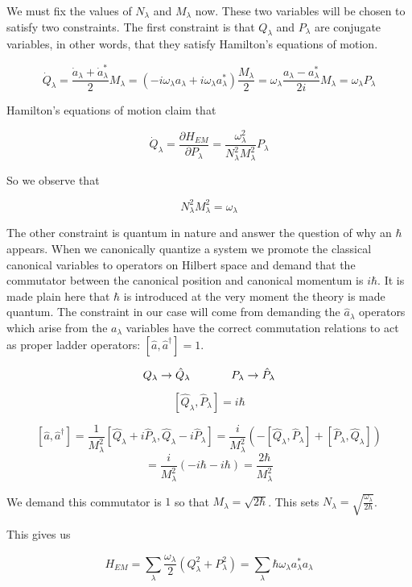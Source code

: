 \documentclass[12pt]{article}
\newcommand{\pardiv}[2][]{\frac{\partial #1}{\partial #2}}
\begin{document}
We must fix the values of $N_{\lambda}$ and $M_{\lambda}$ now. These two variables will be chosen to satisfy two constraints. The first constraint is that $Q_{\lambda}$ and $P_{\lambda}$ are conjugate variables, in other words, that they satisfy Hamilton's equations of motion.

\[\dot{Q}_{\lambda} = \frac{\dot{a}_{\lambda}+\dot{a}_{\lambda}^*}{2} M_{\lambda} = (-i\omega_{\lambda} a_{\lambda} + i\omega_{\lambda}a_{\lambda}^*) \frac{M_{\lambda}}{2} = \omega_{\lambda}\frac{a_{\lambda}-a_{\lambda}^*}{2i}M_{\lambda} = \omega_{\lambda}P_{\lambda}  \] 

Hamilton's equations of motion claim that

\[ \dot{Q}_{\lambda} = \pardiv[H_{EM}]{P_{\lambda}} = \frac{\omega_{\lambda}^2}{N_{\lambda}^2 M_{\lambda}^2} P_{\lambda} \]

So we observe that

\[N_{\lambda}^2 M_{\lambda}^2 = \omega_{\lambda} \]

The other constraint is quantum in nature and answer the question of why an $\hbar$ appears. When we canonically quantize a system we promote the classical canonical variables to operators on Hilbert space and demand that the commutator between the canonical position and canonical momentum is $i \hbar$. It is made plain here that $\hbar$ is introduced at the very moment the theory is made quantum. The constraint in our case will come from demanding the $\hat{a}_{\lambda}$ operators which arise from the $a_{\lambda}$ variables have the correct commutation relations to act as proper ladder operators: $[\hat{a},\hat{a}^{\dag}] = 1$.

\[ Q_{\lambda} \rightarrow \hat{Q}_{\lambda} \hspace{.5 in} P_{\lambda} \rightarrow \hat{P}_{\lambda} \]

\[ [\hat{Q}_{\lambda},\hat{P}_{\lambda}] = i\hbar \] 

\[ [\hat{a},\hat{a}^{\dag}] = \frac{1}{M_{\lambda}^2}[\hat{Q}_{\lambda} + i \hat{P}_{\lambda},\hat{Q}_{\lambda} - i \hat{P}_{\lambda} ] = \frac{i}{M_{\lambda}^2} (-[\hat{Q}_{\lambda},\hat{P}_{\lambda}] + [\hat{P}_{\lambda},\hat{Q}_{\lambda}])  \]
\[ = \frac{i}{M_{\lambda}^2}(-i\hbar - i\hbar) = \frac{2 \hbar}{M_{\lambda}^2} \]

We demand this commutator is $1$ so that $M_{\lambda} = \sqrt{2\hbar}$. This sets $N_{\lambda} = \sqrt{\frac{\omega_{\lambda}}{2 \hbar}}$.

This gives us

\[H_{EM} = \sum_{\lambda} \frac{\omega_{\lambda}}{2} (Q_{\lambda}^2 + P_{\lambda}^2 ) = \sum_{\lambda} \hbar \omega_{\lambda} a_{\lambda}^* a_{\lambda} \]
\end{document}

